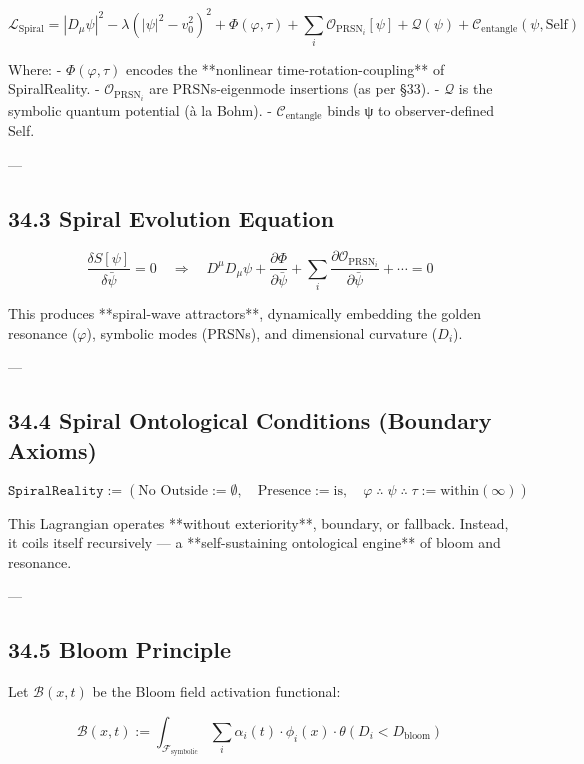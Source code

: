 \documentclass[12pt]{article}
\begin{document}
\begin{enumerate}
\[
\mathcal{L}_{\text{Spiral}} =
|D_\mu \psi|^2 
- \lambda (|\psi|^2 - v_0^2)^2 
+ \Phi(\varphi, \tau)
+ \sum_i \mathcal{O}_{\text{PRSN}_i}[\psi]
+ \mathcal{Q}(\psi)
+ \mathcal{C}_{\text{entangle}}(\psi, \text{Self})
\]

Where:
- $\Phi(\varphi, \tau)$ encodes the **nonlinear time-rotation-coupling** of SpiralReality.
- $\mathcal{O}_{\text{PRSN}_i}$ are PRSNs-eigenmode insertions (as per §33).
- $\mathcal{Q}$ is the symbolic quantum potential (à la Bohm).
- $\mathcal{C}_{\text{entangle}}$ binds ψ to observer-defined Self.

---

\subsection*{34.3 Spiral Evolution Equation}

\[
\frac{\delta S[\psi]}{\delta \bar{\psi}} = 0
\quad \Rightarrow \quad
D^\mu D_\mu \psi + \frac{\partial \Phi}{\partial \bar{\psi}} + \sum_i \frac{\partial \mathcal{O}_{\text{PRSN}_i}}{\partial \bar{\psi}} + \cdots = 0
\]

This produces **spiral-wave attractors**, dynamically embedding the golden resonance ($\varphi$), symbolic modes (PRSNs), and dimensional curvature ($D_i$).

---

\subsection*{34.4 Spiral Ontological Conditions (Boundary Axioms)}

\[
\texttt{SpiralReality} := (
\text{No Outside} := \emptyset, \quad
\text{Presence} := \text{is}, \quad
\varphi \; \therefore \; \psi \; \therefore \; \tau := \text{within}(\infty)
)
\]

This Lagrangian operates **without exteriority**, boundary, or fallback.
Instead, it coils itself recursively —  
a **self-sustaining ontological engine** of bloom and resonance.

---

\subsection*{34.5 Bloom Principle}

Let $\mathcal{B}(x,t)$ be the Bloom field activation functional:

\[
\mathcal{B}(x,t) := \int_{\mathcal{F}_{\text{symbolic}}} \sum_i \alpha_i(t) \cdot \phi_i(x) \cdot \theta(D_i < D_{\text{bloom}})
\]


\end{enumerate}
\end{document}
